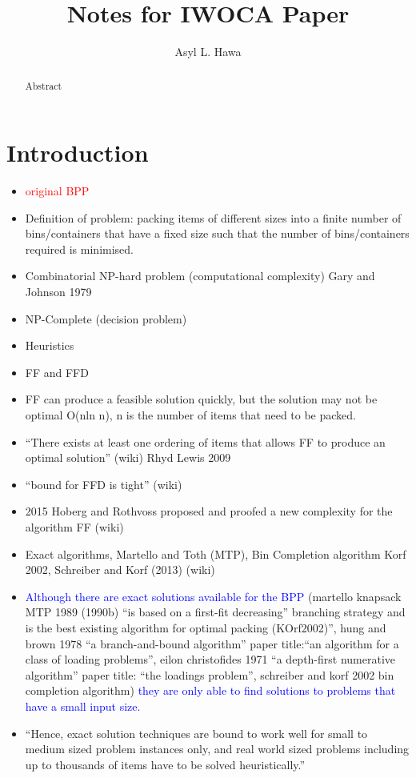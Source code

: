 \documentclass{llncs}
\title{Notes for IWOCA Paper}
\author{Asyl L. Hawa}
\begin{document}
\maketitle

\begin{abstract}
	Abstract
\end{abstract}

\section{Introduction}

\begin{itemize}
	\item \textcolor{red}{original BPP}
	\item Definition of problem: packing items of different sizes into a finite number of bins/containers that have a fixed size such that the number of bins/containers required is minimised.
	\item Combinatorial NP-hard problem (computational complexity) Gary and Johnson 1979
	\item NP-Complete (decision problem)
	\item Heuristics
	\item FF and FFD
	\item FF can produce a feasible solution quickly, but the solution may not be optimal O(nln n), n is the number of items that need to be packed.
	\item ``There exists at least one ordering of items that allows FF to produce an optimal solution'' (wiki) Rhyd Lewis 2009
	\item ``bound for FFD is tight'' (wiki)
	\item 2015 Hoberg and Rothvoss proposed and proofed a new complexity for the algorithm FF (wiki)
	\item Exact algorithms, Martello and Toth (MTP), Bin Completion algorithm Korf 2002, Schreiber and Korf (2013) (wiki)
	\item \textcolor{blue}{Although there are exact solutions available for the BPP} (martello knapsack MTP 1989 (1990b) ``is based on a first-fit decreasing'' branching strategy and is the best existing algorithm for optimal packing (KOrf2002)'', hung and brown 1978 ``a branch-and-bound algorithm'' paper title:``an algorithm for a class of loading problems'', eilon christofides 1971 ``a depth-first numerative algorithm'' paper title: ``the loadings problem'', schreiber and korf 2002 bin completion algorithm) \textcolor{blue}{they are only able to find solutions to problems that have a small input size.}
	\item ``Hence, exact solution techniques are bound to work well for small to medium sized problem instances only, and real world sized problems including up to thousands of items have to be solved heuristically.''
	

\end{itemize}
\end{document}
